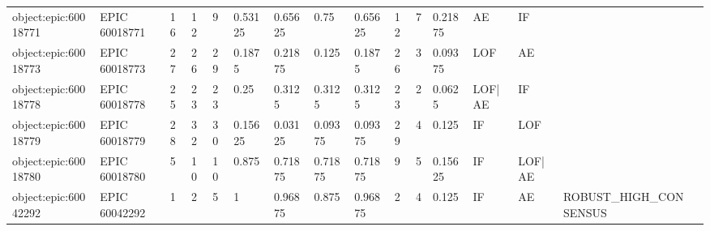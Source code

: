 \begin{longtable}{llllllllllllllll}
object:epic:60018771 & EPIC 60018771 & 16 & 12 & 9 & 0.53125 & 0.65625 & 0.75 & 0.65625 & 12 & 7 & 0.21875 & AE & IF &  &  \\
object:epic:60018773 & EPIC 60018773 & 27 & 26 & 29 & 0.1875 & 0.21875 & 0.125 & 0.1875 & 26 & 3 & 0.09375 & LOF & AE &  &  \\
object:epic:60018778 & EPIC 60018778 & 25 & 23 & 23 & 0.25 & 0.3125 & 0.3125 & 0.3125 & 23 & 2 & 0.0625 & LOF|AE & IF &  &  \\
object:epic:60018779 & EPIC 60018779 & 28 & 32 & 30 & 0.15625 & 0.03125 & 0.09375 & 0.09375 & 29 & 4 & 0.125 & IF & LOF &  &  \\
object:epic:60018780 & EPIC 60018780 & 5 & 10 & 10 & 0.875 & 0.71875 & 0.71875 & 0.71875 & 9 & 5 & 0.15625 & IF & LOF|AE &  &  \\
object:epic:60042292 & EPIC 60042292 & 1 & 2 & 5 & 1 & 0.96875 & 0.875 & 0.96875 & 2 & 4 & 0.125 & IF & AE & ROBUST\_HIGH\_CONSENSUS &  \\
\bottomrule
\end{longtable}
